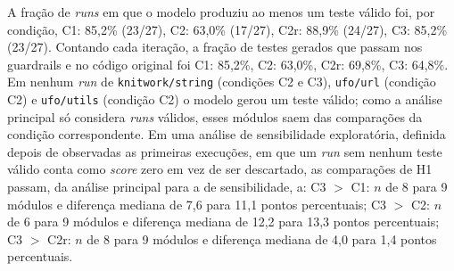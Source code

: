 A fração de \textit{runs} em que o modelo produziu ao menos um teste válido foi, por condição, C1: 85,2\% (23/27), C2: 63,0\% (17/27), C2r: 88,9\% (24/27), C3: 85,2\% (23/27). Contando cada iteração, a fração de testes gerados que passam nos guardrails e no código original foi C1: 85,2\%, C2: 63,0\%, C2r: 69,8\%, C3: 64,8\%. Em nenhum \textit{run} de \texttt{knitwork/string} (condições C2 e C3), \texttt{ufo/url} (condição C2) e \texttt{ufo/utils} (condição C2) o modelo gerou um teste válido; como a análise principal só considera \textit{runs} válidos, esses módulos saem das comparações da condição correspondente. Em uma análise de sensibilidade exploratória, definida depois de observadas as primeiras execuções, em que um \textit{run} sem nenhum teste válido conta como \textit{score} zero em vez de ser descartado, as comparações de H1 passam, da análise principal para a de sensibilidade, a: C3 $>$ C1: $n$ de 8 para 9 módulos e diferença mediana de 7,6 para 11,1 pontos percentuais; C3 $>$ C2: $n$ de 6 para 9 módulos e diferença mediana de 12,2 para 13,3 pontos percentuais; C3 $>$ C2r: $n$ de 8 para 9 módulos e diferença mediana de 4,0 para 1,4 pontos percentuais.
